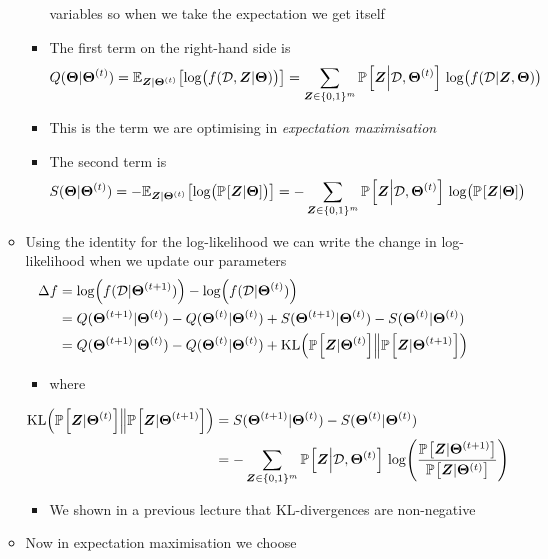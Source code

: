 \documentclass[11pt]{article}
\newcommand{\av}[2][]{\mathbb{E}_{#1\!}\left[ #2 \right]}
\newcommand{\Prob}[2][]{\mathbb{P}_{#1\!}\left[ #2 \right]}
\newcommand{\logg}[1]{\log\!\left( \strut#1 \right)}
\begin{document}
\begin{itemize}
\begin{itemize}
\begin{itemize}
variables so when we take the expectation we get itself
\item The first term on the right-hand side is
$$ Q(\bm{\Theta}|\bm{\Theta}^{(t)}) =
         \av[\bm{Z}|\bm{\Theta}^{(t)}]{\logg{f(\mathcal{D},\bm{Z}|\bm{\Theta})}}
	 =  \sum_{\bm{Z}\in\{0,1\}^m} \Prob{\bm{Z}\middle|\mathcal{D},\bm{\Theta}^{(t)}}\,
         \logg{f(\mathcal{D}|\bm{Z}, \bm{\Theta})} $$
\item This is the term we are optimising in \emph{expectation maximisation}
\item The second term is
$$ S(\bm{\Theta}|\bm{\Theta}^{(t)}) = - \av[\bm{Z}|\bm{\Theta}^{(t)}]{\logg{\Prob{\bm{Z}|\bm{\Theta}} }}
	 =  - \sum_{\bm{Z}\in\{0,1\}^m} \Prob{\bm{Z}\middle|\mathcal{D},\bm{\Theta}^{(t)}}\,
         \logg{\Prob{\bm{Z}|\bm{\Theta}}} $$
\end{itemize}
\item Using the identity for the log-likelihood we can write the
change in log-likelihood when we update our
parameters 
\begin{align*}
\Delta f &=
\logg{f(\mathcal{D}|\bm{\Theta}^{(t+1)})} -
\logg{f(\mathcal{D}|\bm{\Theta}^{(t)})} \\
&= Q(\bm{\Theta}^{(t+1)}|\bm{\Theta}^{(t)}) -
Q(\bm{\Theta}^{(t)}|\bm{\Theta}^{(t)})
+ S(\bm{\Theta}^{(t+1)}|\bm{\Theta}^{(t)}) -
S(\bm{\Theta}^{(t)}|\bm{\Theta}^{(t)}) \\
&= Q(\bm{\Theta}^{(t+1)}|\bm{\Theta}^{(t)}) -
Q(\bm{\Theta}^{(t)}|\bm{\Theta}^{(t)})
+ \mathrm{KL}\!\left( \Prob{\bm{Z}|\bm{\Theta}^{(t)}} \middle\|
  \Prob{\bm{Z}|\bm{\Theta}^{(t+1)}} \right)
 \end{align*}
\begin{itemize}
\item where
\end{itemize}
\begin{align*}
\mathrm{KL}\!\left( \Prob{\bm{Z}|\bm{\Theta}^{(t)}} \middle\|
\Prob{\bm{Z}|\bm{\Theta}^{(t+1)}} \right) &=
S(\bm{\Theta}^{(t+1)}|\bm{\Theta}^{(t)}) -
S(\bm{\Theta}^{(t)}|\bm{\Theta}^{(t)}) \\
&= -  \sum_{\bm{Z}\in\{0,1\}^m} \Prob{\bm{Z}\middle|\mathcal{D},\bm{\Theta}^{(t)}}\,
\logg{\frac{ \Prob{\bm{Z}|\bm{\Theta}^{(t+1)}} }{ \Prob{\bm{Z}|\bm{\Theta}^{(t)}} }} 
\end{align*}
\begin{itemize}
\item We shown in a previous lecture that KL-divergences are non-negative
\end{itemize}
\item Now in expectation maximisation we choose

\end{itemize}
\end{itemize}
\end{document}
